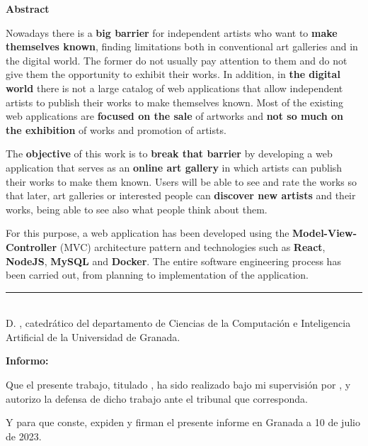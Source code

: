 \noindent\textbf{Abstract}

\bigskip
Nowadays there is a \textbf{big barrier} for independent artists who want to
\textbf{make themselves known}, finding limitations both in conventional art galleries and
in the digital world. The former do not usually pay attention to them and do not give them
the opportunity to exhibit their works. In addition, in \textbf{the digital world} there
is not a large catalog of web applications that allow independent artists to publish their
works to make themselves known. Most of the existing web applications are
\textbf{focused on the sale} of artworks and \textbf{not so much on the exhibition}
of works and promotion of artists.

The \textbf{objective} of this work is to \textbf{break that barrier} by developing
a web application that serves as an \textbf{online art gallery} in which artists can
publish their works to make them known. Users will be able to see and rate the works so
that later, art galleries or interested people can \textbf{discover new artists} and their
works, being able to see also what people think about them.

For this purpose, a web application has been developed using the \textbf{Model-View-Controller}
(MVC) architecture pattern and technologies such as \textbf{React}, \textbf{NodeJS},
\textbf{MySQL} and \textbf{Docker}. The entire software engineering process has been
carried out, from planning to implementation of the application.


\cleardoublepage

\thispagestyle{empty}

\noindent\rule[-1ex]{\textwidth}{2pt}\\[4.5ex]

D. \textbf{\tutor}, catedrático del departamento de Ciencias de la
Computación e Inteligencia Artificial de la Universidad de Granada.

\vspace{0.5cm}

\textbf{Informo:}

\vspace{0.5cm}

Que el presente trabajo, titulado \textit{\textbf{\titulo}},
ha sido realizado bajo mi supervisión por \textbf{\minombre}, y autorizo la defensa de dicho trabajo ante el tribunal
que corresponda.

\vspace{0.5cm}

Y para que conste, expiden y firman el presente informe en Granada a 10 de julio de 2023.

